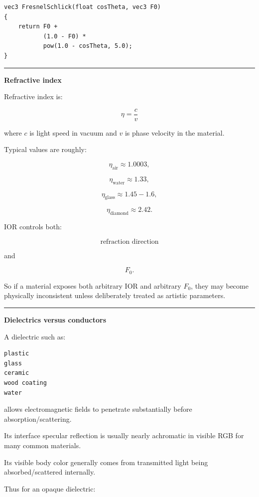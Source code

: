 \begin{verbatim}
vec3 FresnelSchlick(float cosTheta, vec3 F0)
{
    return F0 +
           (1.0 - F0) *
           pow(1.0 - cosTheta, 5.0);
}
\end{verbatim}

\begin{center}\rule{0.5\linewidth}{0.5pt}\end{center}

\textbf{Refractive index}

Refractive index is:

\[
\boxed{
\eta=\frac{c}{v}
}
\]

where \(c\) is light speed in vacuum and \(v\) is phase velocity in the material.

Typical values are roughly:

\[
\eta_{\text{air}}\approx1.0003,
\]

\[
\eta_{\text{water}}\approx1.33,
\]

\[
\eta_{\text{glass}}\approx1.45-1.6,
\]

\[
\eta_{\text{diamond}}\approx2.42.
\]

IOR controls both:

\[
\text{refraction direction}
\]

and

\[
F_0.
\]

So if a material exposes both arbitrary IOR and arbitrary \(F_0\), they may become physically inconsistent unless deliberately treated as artistic parameters.

\begin{center}\rule{0.5\linewidth}{0.5pt}\end{center}

\textbf{Dielectrics versus conductors}

A dielectric such as:

\begin{verbatim}
plastic
glass
ceramic
wood coating
water
\end{verbatim}

allows electromagnetic fields to penetrate substantially before absorption/scattering.

Its interface specular reflection is usually nearly achromatic in visible RGB for many common materials.

Its visible body color generally comes from transmitted light being absorbed/scattered internally.

Thus for an opaque dielectric:

